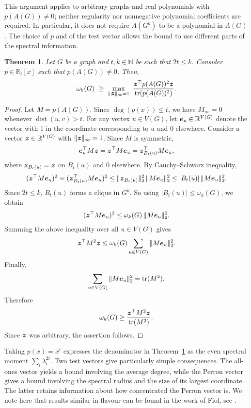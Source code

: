 \documentclass[11pt]{article}
\theoremstyle{plain}
\newtheorem{theorem}{Theorem}[section]
\numberwithin{equation}{section}
\DeclareMathOperator{\tr}{tr}
\DeclareMathOperator{\dist}{dist}
\def\e{\mbox{\boldmath $e$}}
\def\z{\mbox{\boldmath $z$}}
\begin{document}
This argument applies to arbitrary graphs and real polynomials with $p(A(G))\ne 0$; neither regularity nor nonnegative polynomial coefficients are required. In particular, it does not require $A(G^k)$ to be a polynomial in $A(G)$. The choice of $p$ and of the test vector allows the bound to use different parts of the spectral information.

\begin{theorem}\label{thm:general_lower_bound}
Let $G$ be a graph and $t, k \in \mathbb{N}$ be such that $2t \leq k$. Consider $p\in \mathbb{R}_t[x]$ such that $p(A(G))\ne 0$. Then, 
\[\omega_k(G)\ \ge\ \max_{\|\z\|_\infty = 1} \ \frac{\z^\top p(A(G))^2\z}{\tr(p(A(G))^2)}.
\]
\end{theorem}

\begin{proof} Let $M = p(A(G))$. Since $\deg(p(x))\le t$, we have $M_{uv}=0$ whenever $\dist(u,v)>t$. For any vertex $u\in V(G)$, let $\e_u\in \mathbb{R}^{V(G)}$ denote the vector with $1$ in the coordinate corresponding to $u$ and $0$ elsewhere. Consider a vector $\z\in \mathbb{R}^{V(G)}$ with $\|\z\|_\infty = 1$. Since $M$ is symmetric,
\[
        \e_u^\top M\z = \z^\top M\e_u = \z_{B_t(u)}^\top M\e_u,
\]
where $\z_{B_t(u)} = \z$ on $B_t(u)$ and $0$ elsewhere. By Cauchy--Schwarz inequality, 
\[
        (\z^\top M\e_u)^2 = (\z_{B_t(u)}^\top M\e_u)^2
        \le \|\z_{B_t(u)}\|_2^2\,\|M\e_u\|_2^2
        \le |B_t(u)|\,\|M\e_u\|_2^2 .
\]
Since $2t\le k$, $B_t(u)$ forms a clique in $G^k$. So using $|B_t(u)|\le \omega_k(G)$, we obtain
\[
        (\z^\top M\e_u)^2
        \le
        \omega_k(G)\,\|M\e_u\|_2^2 .
\]
Summing the above inequality over all $u\in V(G)$ gives
\[
        \z^\top M^2\z
        \le
        \omega_k(G)\sum_{u\in V(G)} \|M\e_u\|_2^2 .
\]
Finally,
\[
        \sum_{u\in V(G)} \|M\e_u\|_2^2
        =
        \tr(M^2).
\]
Therefore
\[
        \omega_k(G)
        \ge
        \frac{\z^\top M^2\z}
             {\tr(M^2)}.
\]
Since $\z$ was arbitrary, the assertion follows. 
\end{proof}

Taking $p(x)=x^t$ expresses the denominator in Theorem~\ref{thm:general_lower_bound} as the even spectral moment $\sum_i\lambda_i^{2t}$. Two test vectors give particularly simple consequences. The all-ones vector yields a bound involving the average degree, while the Perron vector gives a bound involving the spectral radius and the size of its largest coordinate. The latter retains information about how concentrated the Perron vector is. We note here that results similar in flavour can be found in the work of Fiol, see \cite{Fiol_2002, Fiol_2013}.
\end{document}

